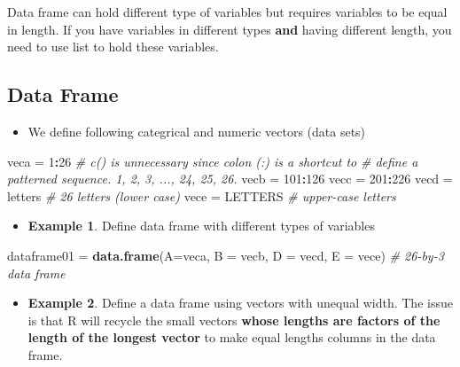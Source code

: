 \documentclass[
]{book}
\newenvironment{Shaded}{\begin{snugshade}}{\end{snugshade}}
\newcommand{\AttributeTok}[1]{\textcolor[rgb]{0.13,0.29,0.53}{#1}}
\newcommand{\CommentTok}[1]{\textcolor[rgb]{0.56,0.35,0.01}{\textit{#1}}}
\newcommand{\DecValTok}[1]{\textcolor[rgb]{0.00,0.00,0.81}{#1}}
\newcommand{\FunctionTok}[1]{\textcolor[rgb]{0.13,0.29,0.53}{\textbf{#1}}}
\newcommand{\NormalTok}[1]{#1}
\newcommand{\OtherTok}[1]{\textcolor[rgb]{0.56,0.35,0.01}{#1}}
\newcommand{\SpecialCharTok}[1]{\textcolor[rgb]{0.81,0.36,0.00}{\textbf{#1}}}
\providecommand{\tightlist}{%
  \setlength{\itemsep}{0pt}\setlength{\parskip}{0pt}}
\begin{document}
Data frame can hold different type of variables but requires variables to be equal in length. If you have variables in different types \textbf{and} having different length, you need to use list to hold these variables.

\hypertarget{data-frame-1}{%
\subsection{Data Frame}\label{data-frame-1}}

\begin{itemize}
\tightlist
\item
  We define following categrical and numeric vectors (data sets)
\end{itemize}

\begin{Shaded}
\begin{Highlighting}[]
\NormalTok{veca }\OtherTok{=} \DecValTok{1}\SpecialCharTok{:}\DecValTok{26}           \CommentTok{\#  c() is unnecessary since colon (:) is a shortcut to}
                      \CommentTok{\#  define a patterned sequence. 1, 2, 3, ..., 24, 25, 26.}
\NormalTok{vecb }\OtherTok{=} \DecValTok{101}\SpecialCharTok{:}\DecValTok{126}
\NormalTok{vecc }\OtherTok{=} \DecValTok{201}\SpecialCharTok{:}\DecValTok{226}
\NormalTok{vecd }\OtherTok{=}\NormalTok{ letters        }\CommentTok{\#  26 letters (lower case)}
\NormalTok{vece }\OtherTok{=}\NormalTok{ LETTERS        }\CommentTok{\#  upper{-}case letters}
\end{Highlighting}
\end{Shaded}

\begin{itemize}
\tightlist
\item
  \textbf{Example 1}. Define data frame with different types of variables
\end{itemize}

\begin{Shaded}
\begin{Highlighting}[]
\NormalTok{dataframe01 }\OtherTok{=} \FunctionTok{data.frame}\NormalTok{(}\AttributeTok{A=}\NormalTok{veca, }\AttributeTok{B =}\NormalTok{ vecb, }\AttributeTok{D =}\NormalTok{ vecd, }\AttributeTok{E =}\NormalTok{ vece)  }\CommentTok{\# 26{-}by{-}3 data frame}
\end{Highlighting}
\end{Shaded}

\begin{itemize}
\tightlist
\item
  \textbf{Example 2}. Define a data frame using vectors with unequal width. The issue is that R will recycle the small vectors \textbf{whose lengths are factors of the length of the longest vector} to make equal lengths columns in the data frame.
\end{itemize}
\end{document}
